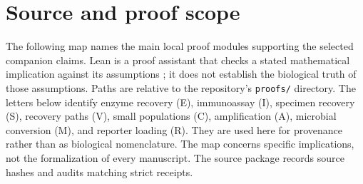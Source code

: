 \section{Source and proof scope}\label{app:map}
The following map names the main local proof modules supporting the selected companion claims. Lean is a proof assistant that checks a stated mathematical implication against its assumptions \citep{lean}; it does not establish the biological truth of those assumptions. Paths are relative to the repository's \texttt{proofs/} directory. The letters below identify enzyme recovery (E), immunoassay (I), specimen recovery (S), recovery paths (V), small populations (C), amplification (A), microbial conversion (M), and reporter loading (R). They are used here for provenance rather than as biological nomenclature. The map concerns specific implications, not the formalization of every manuscript. The source package records source hashes and audits matching strict receipts.

